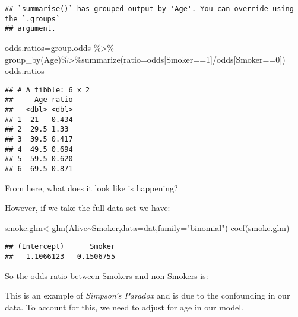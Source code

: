 \documentclass[
]{article}
\newenvironment{Shaded}{\begin{snugshade}}{\end{snugshade}}
\newcommand{\AttributeTok}[1]{\textcolor[rgb]{0.77,0.63,0.00}{#1}}
\newcommand{\DecValTok}[1]{\textcolor[rgb]{0.00,0.00,0.81}{#1}}
\newcommand{\FunctionTok}[1]{\textcolor[rgb]{0.00,0.00,0.00}{#1}}
\newcommand{\NormalTok}[1]{#1}
\newcommand{\OtherTok}[1]{\textcolor[rgb]{0.56,0.35,0.01}{#1}}
\newcommand{\SpecialCharTok}[1]{\textcolor[rgb]{0.00,0.00,0.00}{#1}}
\newcommand{\StringTok}[1]{\textcolor[rgb]{0.31,0.60,0.02}{#1}}
\begin{document}
\begin{verbatim}
## `summarise()` has grouped output by 'Age'. You can override using the `.groups`
## argument.
\end{verbatim}

\begin{Shaded}
\begin{Highlighting}[]
\NormalTok{odds.ratios}\OtherTok{=}\NormalTok{group.odds }\SpecialCharTok{\%\textgreater{}\%} \FunctionTok{group\_by}\NormalTok{(Age)}\SpecialCharTok{\%\textgreater{}\%}\FunctionTok{summarize}\NormalTok{(}\AttributeTok{ratio=}\NormalTok{odds[Smoker}\SpecialCharTok{==}\DecValTok{1}\NormalTok{]}\SpecialCharTok{/}\NormalTok{odds[Smoker}\SpecialCharTok{==}\DecValTok{0}\NormalTok{])}
\NormalTok{odds.ratios}
\end{Highlighting}
\end{Shaded}

\begin{verbatim}
## # A tibble: 6 x 2
##     Age ratio
##   <dbl> <dbl>
## 1  21   0.434
## 2  29.5 1.33 
## 3  39.5 0.417
## 4  49.5 0.694
## 5  59.5 0.620
## 6  69.5 0.871
\end{verbatim}

From here, what does it look like is happening?

\vspace{1.in}

However, if we take the full data set we have:

\begin{Shaded}
\begin{Highlighting}[]
\NormalTok{smoke.glm}\OtherTok{\textless{}{-}}\FunctionTok{glm}\NormalTok{(Alive}\SpecialCharTok{\textasciitilde{}}\NormalTok{Smoker,}\AttributeTok{data=}\NormalTok{dat,}\AttributeTok{family=}\StringTok{"binomial"}\NormalTok{)}
\FunctionTok{coef}\NormalTok{(smoke.glm)}
\end{Highlighting}
\end{Shaded}

\begin{verbatim}
## (Intercept)      Smoker 
##   1.1066123   0.1506755
\end{verbatim}

So the odds ratio between Smokers and non-Smokers is:

\vspace{.5in}

This is an example of \textit{Simpson's Paradox} and is due to the
confounding in our data. To account for this, we need to adjust for age
in our model.
\end{document}

